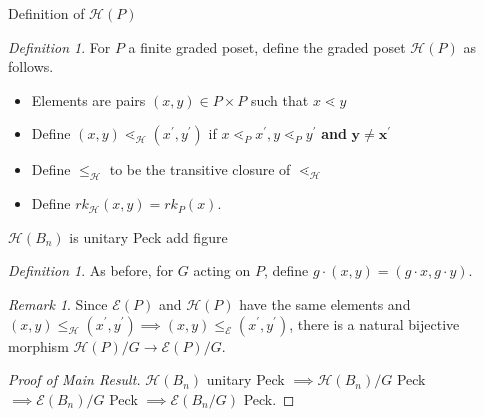 \documentclass{beamer}
\theoremstyle{remark}
\newtheorem{rem}[thm]{Remark}
\newtheorem{defn}[thm]{Definition}
\begin{document}
\begin{frame}{Definition of $\mathcal{H}(P)$}
\begin{defn}
For $P$ a finite graded poset, define the graded poset $\mathcal H(P)$ as follows.
\begin{itemize}
\item Elements are pairs $(x,y)\in P\times P$ such that $x\lessdot y$

\item Define $(x,y) \lessdot_{\mathcal H} (x^\prime,y^\prime)$ if $x \lessdot_P x^\prime,y\lessdot_P y^\prime$ \textbf{and} $\mathbf{y \ne x^\prime}$

\item Define $\leq_{\mathcal H}$ to be the transitive closure of $\lessdot_{\mathcal H}$

\item Define $rk_{\mathcal H}(x,y) = rk_P(x).$
\end{itemize}
\end{defn}
\end{frame}









\begin{frame}{$\mathcal{H}(B_n)$ is unitary Peck}
add figure   %
\end{frame}







\begin{frame}
\begin{defn}
As before, for $G$ acting on $P$, define $g\cdot (x,y) = (g\cdot x,g\cdot y)$.
\end{defn}

\begin{rem}
Since $\mathcal{E}(P)$ and $\mathcal{H}(P)$ have the same elements and $(x,y)\le_{\mathcal{H}} (x^\prime,y^\prime) \implies (x,y)\le_{\mathcal{E}} (x^\prime,y^\prime)$, there is a natural bijective morphism $\mathcal{H}(P)/G\rightarrow \mathcal{E}(P)/G$.
\end{rem}

\begin{proof}[Proof of Main Result]
$\mathcal{H}(B_n)$ unitary Peck $\implies \mathcal{H}(B_n)/G$ Peck $\implies \mathcal{E}(B_n)/G$ Peck $\implies \mathcal{E}(B_n/G)$ Peck.
\end{proof}
\end{frame}
\end{document}

